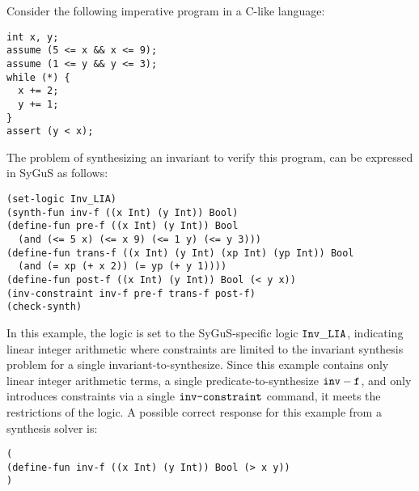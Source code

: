 \documentclass[english,a4paper,10pt]{article}
\begin{document}
\begin{example}
Consider the following imperative program in a C-like language:
\begin{lstlisting}[language=C-Like]
int x, y;
assume (5 <= x && x <= 9);
assume (1 <= y && y <= 3);
while (*) {
  x += 2;
  y += 1;
}
assert (y < x);
\end{lstlisting}
The problem of synthesizing an invariant to verify this program,
can be expressed in SyGuS as follows:
\begin{lstlisting}[language=SyGuS]
(set-logic Inv_LIA)
(synth-fun inv-f ((x Int) (y Int)) Bool)
(define-fun pre-f ((x Int) (y Int)) Bool 
  (and (<= 5 x) (<= x 9) (<= 1 y) (<= y 3)))
(define-fun trans-f ((x Int) (y Int) (xp Int) (yp Int)) Bool 
  (and (= xp (+ x 2)) (= yp (+ y 1))))
(define-fun post-f ((x Int) (y Int)) Bool (< y x))
(inv-constraint inv-f pre-f trans-f post-f)
(check-synth)
\end{lstlisting}
In this example, the logic is set to the SyGuS-specific logic
${\tt Inv\_LIA}$, indicating linear integer arithmetic
where constraints are limited to the invariant synthesis problem for
a single invariant-to-synthesize.
Since this example contains only linear integer arithmetic terms,
a single predicate-to-synthesize ${\tt inv-f}$,
and only introduces constraints via a single $\texttt{inv-constraint}$ command,
it meets the restrictions of the logic.
A possible correct response for this example from a synthesis solver is:
\begin{lstlisting}[language=SyGuS]
(
(define-fun inv-f ((x Int) (y Int)) Bool (> x y))
)
\end{lstlisting}
\end{example}
\end{document}
